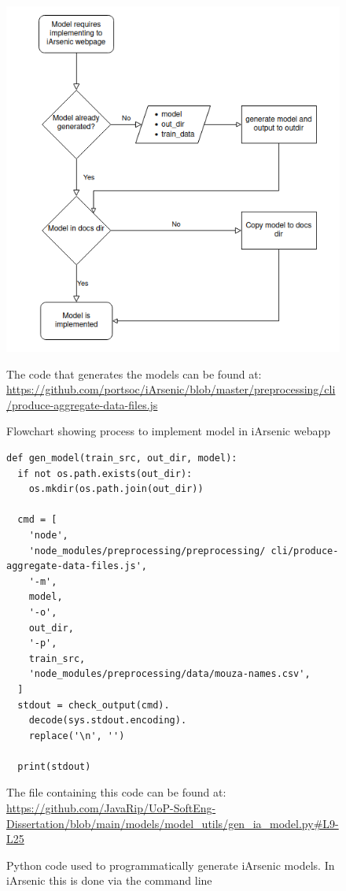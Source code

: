 \begin{figure}[ht]
    \centering
    \includegraphics[scale=0.6]{figures/implement_ia_model_to_webapp.png} 
    \caption{Flowchart showing process to implement model in iArsenic webapp}
    \label{fig:x imp_iam_webapp}
    \small The code that generates the models can be found at: \url{https://github.com/portsoc/iArsenic/blob/master/preprocessing/cli/produce-aggregate-data-files.js}
\end{figure}

\begin{figure}[h]
    \begin{verbatim}
def gen_model(train_src, out_dir, model):
  if not os.path.exists(out_dir):
    os.mkdir(os.path.join(out_dir))

  cmd = [
    'node',
    'node_modules/preprocessing/preprocessing/ cli/produce-aggregate-data-files.js', 
    '-m',
    model,
    '-o',
    out_dir,
    '-p',
    train_src,
    'node_modules/preprocessing/data/mouza-names.csv',
  ]
  stdout = check_output(cmd).
    decode(sys.stdout.encoding).
    replace('\n', '')
    
  print(stdout)
    \end{verbatim}
    \caption{Python code used to programmatically generate iArsenic models. In iArsenic this is done via the command line}
    \label{fig:x programmatically_gen_ia_model}
    \small The file containing this code can be found at: \url{https://github.com/JavaRip/UoP-SoftEng-Dissertation/blob/main/models/model_utils/gen_ia_model.py#L9-L25}
\end{figure}

